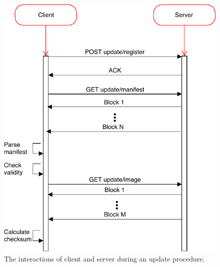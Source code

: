 \documentclass[0-thesis.tex]{subfiles}
\begin{document}
\begin{figure}
    \caption{The interactions of client and server during an update procedure.}
    \label{fig:client-server-interaction}
    \includegraphics{images/client-server-sequence.pdf}
\end{figure}
\end{document}
